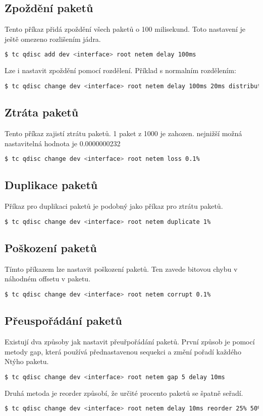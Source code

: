 \subsection*{Zpoždění paketů}
Tento příkaz přidá zpoždění všech paketů o 100 milisekund. Toto nastavení je ještě omezeno rozlišením jádra.
\begin{lstlisting}[language=bash]
    $ tc qdisc add dev <interface> root netem delay 100ms
\end{lstlisting}

Lze i nastavit zpoždění pomocí rozdělení. Příklad s normalním rozdělením:
\begin{lstlisting}[language=bash]
    $ tc qdisc change dev <interface> root netem delay 100ms 20ms distribution normal
\end{lstlisting}

\subsection*{Ztráta paketů}
Tento příkaz zajistí ztrátu paketů. 1 paket z 1000 je zahozen. nejnižší možná nastavitelná hodnota je 0.0000000232%
\begin{lstlisting}[language=bash]
    $ tc qdisc change dev <interface> root netem loss 0.1%
\end{lstlisting}

\subsection*{Duplikace paketů}
Příkaz pro duplikaci paketů je podobný jako příkaz pro ztrátu paketů.
\begin{lstlisting}[language=bash]
    $ tc qdisc change dev <interface> root netem duplicate 1%
\end{lstlisting}

\subsection*{Poškození paketů}
Tímto příkazem lze nastavit poškození paketů. Ten zavede bitovou chybu v náhodném offsetu v paketu.
\begin{lstlisting}[language=bash]
    $ tc qdisc change dev <interface> root netem corrupt 0.1%
\end{lstlisting}

\subsection*{Přeuspořádání paketů}
Existují dva způsoby jak nastavit přeuřpořádání paketů.
První způsob je pomocí metody gap, která používá přednastavenou sequekci a změní pořadí každého Ntýho paketu.
\begin{lstlisting}[language=bash]
    $ tc qdisc change dev <interface> root netem gap 5 delay 10ms
\end{lstlisting}
Druhá metoda je reorder způsobí, že určité procento paketů se špatně seřadí.
\begin{lstlisting}[language=bash]
    $ tc qdisc change dev <interface> root netem delay 10ms reorder 25% 50%
\end{lstlisting}

